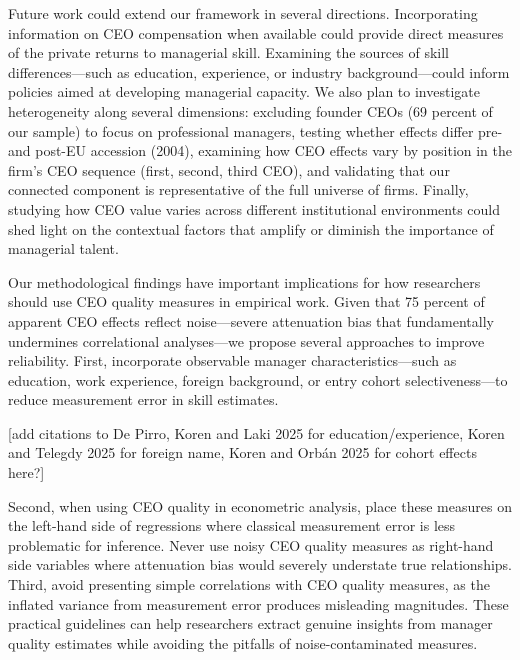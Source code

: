 \documentclass[11pt,a4paper]{article}
\begin{document}
Future work could extend our framework in several directions. Incorporating information on CEO compensation when available could provide direct measures of the private returns to managerial skill. Examining the sources of skill differences—such as education, experience, or industry background—could inform policies aimed at developing managerial capacity. We also plan to investigate heterogeneity along several dimensions: excluding founder CEOs (69 percent of our sample) to focus on professional managers, testing whether effects differ pre- and post-EU accession (2004), examining how CEO effects vary by position in the firm's CEO sequence (first, second, third CEO), and validating that our connected component is representative of the full universe of firms. Finally, studying how CEO value varies across different institutional environments could shed light on the contextual factors that amplify or diminish the importance of managerial talent.

Our methodological findings have important implications for how researchers should use CEO quality measures in empirical work. Given that 75 percent of apparent CEO effects reflect noise—severe attenuation bias that fundamentally undermines correlational analyses—we propose several approaches to improve reliability. First, incorporate observable manager characteristics—such as education, work experience, foreign background, or entry cohort selectiveness—to reduce measurement error in skill estimates. 

[add citations to De Pirro, Koren and Laki 2025 for education/experience, Koren and Telegdy 2025 for foreign name, Koren and Orbán 2025 for cohort effects here?] 

Second, when using CEO quality in econometric analysis, place these measures on the left-hand side of regressions where classical measurement error is less problematic for inference. Never use noisy CEO quality measures as right-hand side variables where attenuation bias would severely understate true relationships. Third, avoid presenting simple correlations with CEO quality measures, as the inflated variance from measurement error produces misleading magnitudes. These practical guidelines can help researchers extract genuine insights from manager quality estimates while avoiding the pitfalls of noise-contaminated measures.
\end{document}
